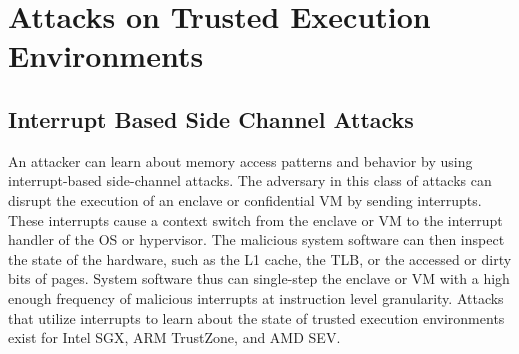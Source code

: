 \section{Attacks on Trusted Execution Environments}


\subsection{Interrupt Based Side Channel Attacks}
\label{sec:20:interrupt_sca}
An attacker can learn about memory access patterns and behavior by using
interrupt-based side-channel attacks. The adversary in this class of attacks can
disrupt the execution of an enclave or confidential VM by sending interrupts.
These interrupts cause a context switch from the enclave or VM to the interrupt
handler of the OS or hypervisor. The malicious system software can then inspect
the state of the hardware, such as the L1 cache, the TLB, or the accessed or
dirty bits of pages. System software thus can single-step the enclave or VM with
a high enough frequency of malicious interrupts at instruction level
granularity. Attacks that utilize interrupts to learn about the state of trusted
execution environments exist for Intel SGX, ARM TrustZone, and AMD
SEV.\cite{van2017sgx, kou2021load, wilke2023sev}\\

